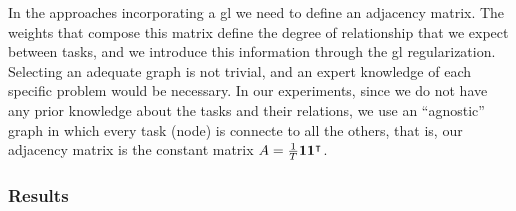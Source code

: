 In the approaches incorporating a \acrshort{gl} we need to define an adjacency matrix. The weights that compose this matrix define the degree of relationship that we expect between tasks, and we introduce this information through the \acrshort{gl} regularization.
%
Selecting an adequate graph is not trivial, and an expert knowledge of each specific problem would be necessary. In our experiments, since we do not have any prior knowledge about the tasks and their relations, we use an ``agnostic'' graph in which every task (node) is connecte to all the others, that is, our adjacency matrix is the constant matrix $A = \frac{1}{T} \bm{1} \bm{1}^\intercal$.

\subsubsection*{Results}

